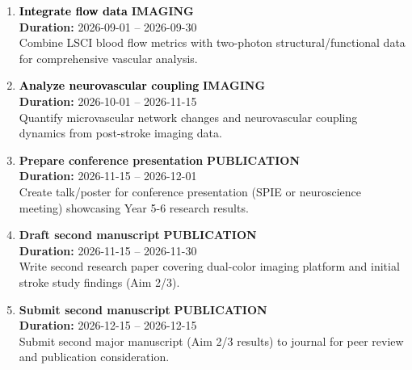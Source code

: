 \documentclass[a4paper]{article}
\newcommand{\cellcolor}[2]{\colorbox{#1}{#2}}
\begin{document}
\begin{enumerate}[leftmargin=0.3cm, itemsep=0.3em, parsep=0.1em, topsep=0.1em]
    \item \textcolor{black}{\textbf{\Large Integrate flow data}}
          \hfill \cellcolor{black!15}{\textbf{\small IMAGING}}
          \\ \textcolor{black!60}{\textbf{Duration:} 2026-09-01 -- 2026-09-30} \\ \textcolor{black!80}{\small Combine LSCI blood flow metrics with two-photon structural/functional data for comprehensive vascular analysis.}

    \item \textcolor{black}{\textbf{\Large Analyze neurovascular coupling}}
          \hfill \cellcolor{black!15}{\textbf{\small IMAGING}}
          \\ \textcolor{black!60}{\textbf{Duration:} 2026-10-01 -- 2026-11-15} \\ \textcolor{black!80}{\small Quantify microvascular network changes and neurovascular coupling dynamics from post-stroke imaging data.}

    \item \textcolor{researchout}{\textbf{\Large Prepare conference presentation}}
          \hfill \cellcolor{researchout!15}{\textbf{\small PUBLICATION}}
          \\ \textcolor{black!60}{\textbf{Duration:} 2026-11-15 -- 2026-12-01} \\ \textcolor{black!80}{\small Create talk/poster for conference presentation (SPIE or neuroscience meeting) showcasing Year 5-6 research results.}

    \item \textcolor{researchout}{\textbf{\Large Draft second manuscript}}
          \hfill \cellcolor{researchout!15}{\textbf{\small PUBLICATION}}
          \\ \textcolor{black!60}{\textbf{Duration:} 2026-11-15 -- 2026-11-30} \\ \textcolor{black!80}{\small Write second research paper covering dual-color imaging platform and initial stroke study findings (Aim 2/3).}

    \item \textcolor{researchout}{\textbf{\Large Submit second manuscript}}
          \hfill \cellcolor{researchout!15}{\textbf{\small PUBLICATION}}
          \\ \textcolor{black!60}{\textbf{Duration:} 2026-12-15 -- 2026-12-15} \\ \textcolor{black!80}{\small Submit second major manuscript (Aim 2/3 results) to journal for peer review and publication consideration.}


\end{enumerate}
\end{document}
